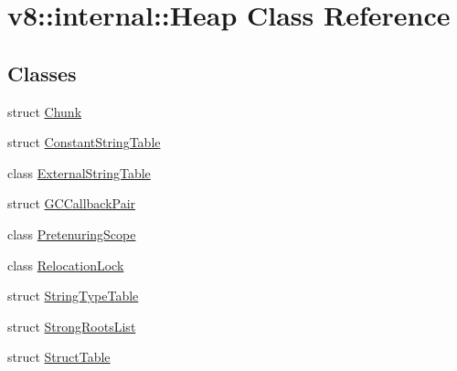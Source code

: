 \hypertarget{classv8_1_1internal_1_1_heap}{}\section{v8\+:\+:internal\+:\+:Heap Class Reference}
\label{classv8_1_1internal_1_1_heap}
\subsection*{Classes}
\begin{DoxyCompactItemize}
\item 
struct \hyperlink{structv8_1_1internal_1_1_heap_1_1_chunk}{Chunk}
\item 
struct \hyperlink{structv8_1_1internal_1_1_heap_1_1_constant_string_table}{Constant\+String\+Table}
\item 
class \hyperlink{classv8_1_1internal_1_1_heap_1_1_external_string_table}{External\+String\+Table}
\item 
struct \hyperlink{structv8_1_1internal_1_1_heap_1_1_g_c_callback_pair}{G\+C\+Callback\+Pair}
\item 
class \hyperlink{classv8_1_1internal_1_1_heap_1_1_pretenuring_scope}{Pretenuring\+Scope}
\item 
class \hyperlink{classv8_1_1internal_1_1_heap_1_1_relocation_lock}{Relocation\+Lock}
\item 
struct \hyperlink{structv8_1_1internal_1_1_heap_1_1_string_type_table}{String\+Type\+Table}
\item 
struct \hyperlink{structv8_1_1internal_1_1_heap_1_1_strong_roots_list}{Strong\+Roots\+List}
\item 
struct \hyperlink{structv8_1_1internal_1_1_heap_1_1_struct_table}{Struct\+Table}
\end{DoxyCompactItemize}
